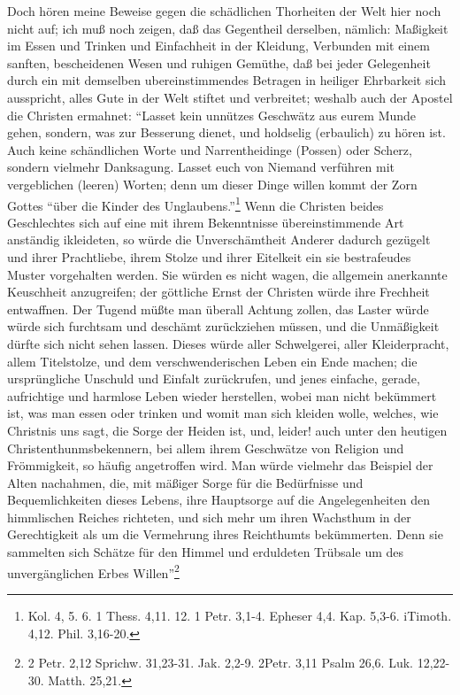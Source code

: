 Doch hören meine Beweise gegen die schädlichen Thorheiten der Welt hier noch nicht auf; ich muß noch zeigen, daß das Gegentheil derselben, nämlich: Maßigkeit im Essen und Trinken und Einfachheit in der Kleidung, Verbunden mit einem sanften, bescheidenen Wesen und ruhigen Gemüthe, daß bei jeder Gelegenheit durch ein mit demselben ubereinstimmendes Betragen in heiliger Ehrbarkeit sich ausspricht, alles Gute in der Welt stiftet und verbreitet; weshalb auch der Apostel die Christen ermahnet: "`Lasset kein unnützes Geschwätz aus eurem Munde gehen, sondern, was zur Besserung dienet, und holdselig (erbaulich) zu hören ist. Auch keine schändlichen Worte und Narrentheidinge (Possen) oder Scherz, sondern vielmehr Danksagung. Lasset euch von Niemand verführen mit vergeblichen (leeren) Worten; denn um dieser Dinge willen kommt der Zorn Gottes "`über die Kinder des Unglaubens."'\footnote{Kol. 4, 5. 6. 1  Thess. 4,11. 12. 1 Petr. 3,1-4. Epheser 4,4. Kap. 5,3-6. iTimoth. 4,12. Phil. 3,16-20.} Wenn die Christen beides Geschlechtes sich auf eine mit ihrem Bekenntnisse übereinstimmende Art anständig ikleideten, so würde die Unverschämtheit Anderer dadurch gezügelt und ihrer Prachtliebe, ihrem Stolze und ihrer Eitelkeit ein sie bestrafeudes Muster vorgehalten werden. Sie würden es nicht wagen, die allgemein anerkannte Keuschheit anzugreifen; der göttliche Ernst der Christen würde ihre Frechheit entwaffnen. Der Tugend müßte man überall Achtung zollen, das Laster würde würde sich furchtsam und deschämt zurückziehen müssen, und die Unmäßigkeit dürfte sich nicht sehen lassen. Dieses würde aller Schwelgerei, aller Kleiderpracht, allem Titelstolze, und dem verschwenderischen Leben ein Ende machen; die ursprüngliche Unschuld und Einfalt zurückrufen, und jenes einfache, gerade, aufrichtige und harmlose Leben wieder herstellen, wobei man nicht bekümmert ist, was man essen oder trinken und womit man sich kleiden wolle, welches, wie Christnis uns sagt, die Sorge der Heiden ist, und, leider! auch unter den heutigen Christenthunmsbekennern, bei allem ihrem Geschwätze von Religion und Frömmigkeit, so häufig angetroffen wird. Man würde vielmehr das Beispiel der Alten nachahmen, die, mit mäßiger Sorge für die Bedürfnisse und Bequemlichkeiten dieses Lebens, ihre Hauptsorge auf die Angelegenheiten den himmlischen Reiches richteten, und sich mehr um ihren Wachsthum in der Gerechtigkeit als um die Vermehrung ihres Reichthumts bekümmerten. Denn sie sammelten sich Schätze für den Himmel und erduldeten Trübsale um des unvergänglichen Erbes Willen"'\footnote{2 Petr. 2,12 Sprichw. 31,23-31. Jak. 2,2-9. 2Petr. 3,11 Psalm 26,6. Luk. 12,22-30. Matth. 25,21.}

